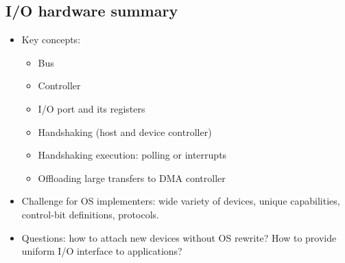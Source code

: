 \subsection{I/O hardware summary}
\begin{itemize}
    \item Key concepts:
    \begin{itemize}
        \item Bus
        \item Controller
        \item I/O port and its registers
        \item Handshaking (host and device controller)
        \item Handshaking execution: polling or interrupts
        \item Offloading large transfers to DMA controller
    \end{itemize}
    \item Challenge for OS implementers: wide variety of devices, unique capabilities, control-bit definitions, protocols.
    \item Questions: how to attach new devices without OS rewrite? How to provide uniform I/O interface to applications?
\end{itemize}

